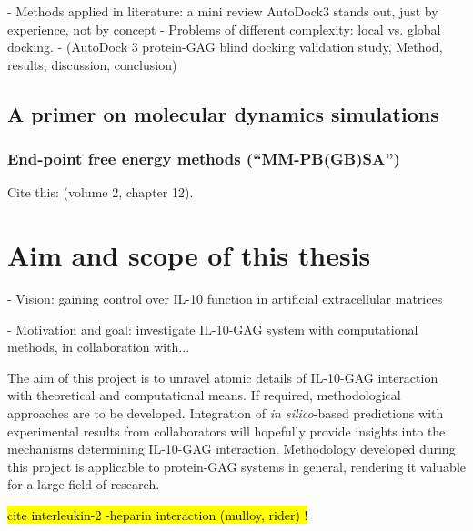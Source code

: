     - Methods applied in literature: a mini review
        AutoDock3 stands out, just by experience, not by concept
    - Problems of different complexity: local vs. global docking.
    - (AutoDock 3 protein-GAG blind docking validation study,
        Method, results, discussion, conclusion)

\lipsum[1-5]

\subsection{A primer on molecular dynamics simulations}

\lipsum[1-5]

\subsubsection{End-point free energy methods (\enquote{MM-PB(GB)SA})}
\label{methods:mmpbsa_mmgbsa}


Cite this: \cite{schlick_innovationsdynamics_2012} (volume 2, chapter 12).

\lipsum[1-5]




\section{Aim and scope of this thesis}

- Vision: gaining control over IL-10 function in artificial extracellular matrices

- Motivation and goal: investigate IL-10-GAG system with computational
      methods, in collaboration with...

The aim of this project is to unravel atomic details of IL-10-GAG interaction
with theoretical and computational means. If required, methodological approaches
are to be developed. Integration of \textit{in silico}-based predictions with
experimental results from collaborators will hopefully provide insights into the
mechanisms determining IL-10-GAG interaction. Methodology developed during this
project is applicable to protein-GAG systems in general, rendering it valuable
for a large field of research.



\hl{cite interleukin-2 -heparin interaction (mulloy, rider) !}

\lipsum[1-5]





